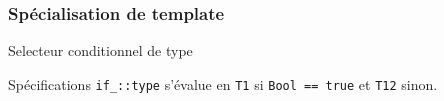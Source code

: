 \documentclass[svgnames]{beamer}
\begin{document}
\frame
{
  \frametitle{Spécialisation de template}
  \begin{block}{Selecteur conditionnel de type}
  {
    \begin{block}{Spécifications}
    \texttt{if\_<Bool,T1,T2>::type} s'évalue en \texttt{T1} si \texttt{Bool == true} et \texttt{T12} sinon.
    \end{block}
  }
  \end{block}
}
\end{document}

